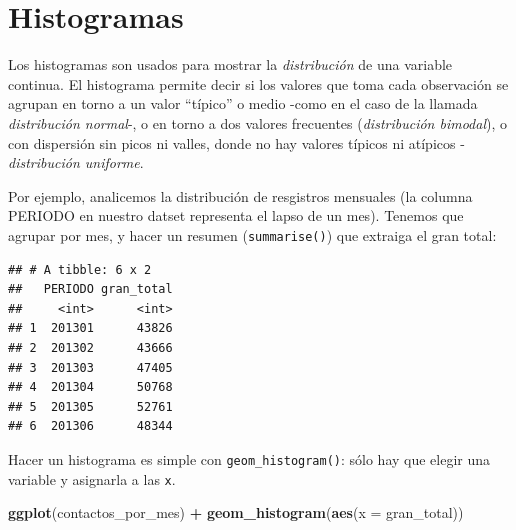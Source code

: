 \documentclass[spanish,]{book}
\newenvironment{Shaded}{\begin{snugshade}}{\end{snugshade}}
\newcommand{\DataTypeTok}[1]{\textcolor[rgb]{0.13,0.29,0.53}{#1}}
\newcommand{\KeywordTok}[1]{\textcolor[rgb]{0.13,0.29,0.53}{\textbf{#1}}}
\newcommand{\NormalTok}[1]{#1}
\newcommand{\OperatorTok}[1]{\textcolor[rgb]{0.81,0.36,0.00}{\textbf{#1}}}
\newcommand{\StringTok}[1]{\textcolor[rgb]{0.31,0.60,0.02}{#1}}
\begin{document}
\hypertarget{histogramas}{%
\section{Histogramas}\label{histogramas}}

Los histogramas son usados para mostrar la \emph{distribución} de una variable continua. El histograma permite decir si los valores que toma cada observación se agrupan en torno a un valor ``típico'' o medio -como en el caso de la llamada \emph{distribución normal}-, o en torno a dos valores frecuentes (\emph{distribución bimodal}), o con dispersión sin picos ni valles, donde no hay valores típicos ni atípicos - \emph{distribución uniforme}.

Por ejemplo, analicemos la distribución de resgistros mensuales (la columna PERIODO en nuestro datset representa el lapso de un mes). Tenemos que agrupar por mes, y hacer un resumen (\texttt{summarise()}) que extraiga el gran total:

\begin{Shaded}
\end{Shaded}

\begin{verbatim}
## # A tibble: 6 x 2
##   PERIODO gran_total
##     <int>      <int>
## 1  201301      43826
## 2  201302      43666
## 3  201303      47405
## 4  201304      50768
## 5  201305      52761
## 6  201306      48344
\end{verbatim}

Hacer un histograma es simple con \texttt{geom\_histogram()}: sólo hay que elegir una variable y asignarla a las \texttt{x}.

\begin{Shaded}
\begin{Highlighting}[]
\KeywordTok{ggplot}\NormalTok{(contactos_por_mes) }\OperatorTok{+}\StringTok{ }
\StringTok{    }\KeywordTok{geom_histogram}\NormalTok{(}\KeywordTok{aes}\NormalTok{(}\DataTypeTok{x =}\NormalTok{ gran_total))}
\end{Highlighting}
\end{Shaded}
\end{document}
